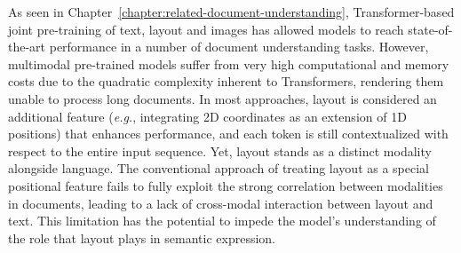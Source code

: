 \newpage

\minitoc
{}


As seen in Chapter~\ref{chapter:related-document-understanding}, Transformer-based joint pre-training of text, layout and images has allowed models to reach state-of-the-art performance in a number of document understanding tasks. However, multimodal pre-trained models suffer from very high computational and memory costs due to the quadratic complexity inherent to Transformers, rendering them unable to process long documents. In most approaches, layout is considered an additional feature (\textit{e.g.}, integrating 2D coordinates as an extension of 1D positions) that enhances performance, and each token is still contextualized with respect to the entire input sequence. Yet, layout stands as a distinct modality alongside language. The conventional approach of treating layout as a special positional feature fails to fully exploit the strong correlation between modalities in documents, leading to a lack of cross-modal interaction between layout and text. This limitation has the potential to impede the model's understanding of the role that layout plays in semantic expression.

